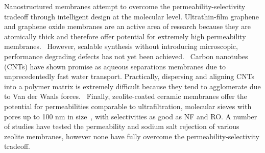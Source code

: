 \documentclass{article}
\begin{document}
  Nanostructured membranes attempt to overcome the permeability-selectivity 
  tradeoff through intelligent design at the molecular level. Ultrathin-film
  graphene and graphene oxide membranes are an active area of research because
  they are atomically thick and therefore offer potential for extremely high
  permeability membranes.~\cite{humplik_nanostructured_2011} However, scalable
  synthesis without introducing microscopic, performance degrading defects has
  not yet been achieved.~\cite{cohen-tanugi_multilayer_2016,wei_multilayered_2018}
  Carbon nanotubes (CNTs) have shown promise as aqueous separations membranes
  due to unprecedentedly fast water transport.\cite{humplik_nanostructured_2011,hummer_water_2001} 
  Practically, dispersing and aligning CNTs into a polymer matrix is extremely
  difficult because they tend to agglomerate due to Van der Waals forces.~\cite{sahoo_polymer_2010}
  Finally, zeolite-coated ceramic membranes offer the potential for permeabilities
  comparable to ultrafiltration, molecular sieves with pores up to 100 nm in 
  size~\cite{werber_materials_2016}, with selectivities as good as NF and RO. 
  A number of studies have tested the permeability and sodium salt rejection
  of various zeolite membranes, however none have fully overcome the 
  permeability-selectivity tradeoff.~\cite{pendergast_review_2011,auerbach_handbook_2003,li_novel_2007}
\end{document}
